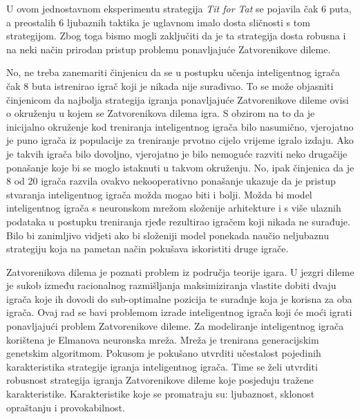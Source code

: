 \documentclass[zavrsnirad]{fer}
\begin{document}
	U ovom jednostavnom eksperimentu strategija \textit{Tit for Tat} se pojavila čak 6 puta, a preostalih 6 ljubaznih taktika je uglavnom imalo dosta sličnosti s tom strategijom. Zbog toga bismo mogli zaključiti da je ta strategija dosta robusna i na neki način prirodan pristup problemu ponavljajuće Zatvorenikove dileme.
	
	No, ne treba zanemariti činjenicu da se u postupku učenja inteligentnog igrača čak 8 buta istrenirao igrač koji je nikada nije surađivao. To se može objasniti činjenicom da najbolja strategija igranja ponavljajuće Zatvorenikove dileme ovisi o okruženju u kojem se Zatvorenikova dilema igra. S obzirom na to da je inicijalno okruženje kod treniranja inteligentnog igrača bilo nasumično, vjerojatno je puno igrača iz populacije za treniranje prvotno cijelo vrijeme igralo izdaju. Ako je takvih igrača bilo dovoljno, vjerojatno je bilo nemoguće razviti neko drugačije ponašanje koje bi se moglo istaknuti u takvom okruženju. No, ipak činjenica da je 8 od 20 igrača razvila ovakvo nekooperativno ponašanje ukazuje da je pristup stvaranja inteligentnog igrača možda mogao biti i bolji. Možda bi model inteligentnog igrača s neuronskom mrežom složenije arhitekture i s više ulaznih podataka u postupku treniranja rjeđe rezultirao igračem koji nikada ne surađuje. Bilo bi zanimljivo vidjeti ako bi složeniji model ponekada naučio neljubaznu strategiju koja na pametan način pokušava iskoristiti druge igrače.









\begin{sazetak}
	
	Zatvorenikova dilema je poznati problem iz područja teorije igara. U jezgri dileme je sukob između racionalnog razmišljanja maksimiziranja vlastite dobiti dvaju igrača koje ih dovodi do sub-optimalne pozicija te suradnje koja je korisna za oba igrača. Ovaj rad se bavi problemom izrade inteligentnog igrača koji će moći igrati ponavljajući problem Zatvorenikove dileme. Za modeliranje inteligentnog igrača korištena je Elmanova neuronska mreža. Mreža je trenirana generacijskim genetskim algoritmom. Pokusom je pokušano utvrditi učestalost pojedinih karakteristika strategije igranja inteligentnog igrača. Time se želi utvrditi robusnost strategija igranja Zatvorenikove dileme koje posjeduju tražene karakteristike. Karakteristike koje se promatraju su: ljubaznost, sklonost opraštanju i provokabilnost.

\end{sazetak}
\end{document}
